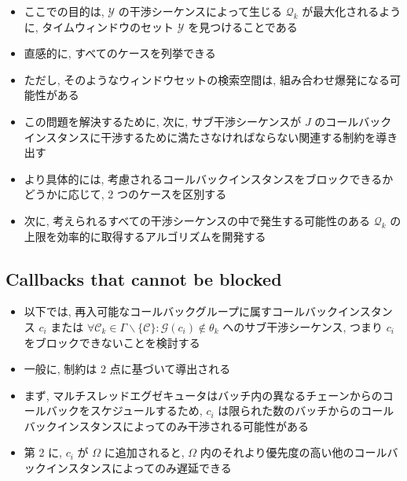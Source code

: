 \begin{frame}{}
    \begin{itemize}
        \item ここでの目的は, $\mathcal{Y}$ の干渉シーケンスによって生じる $\mathcal{Q}_{k}$ が最大化されるように, タイムウィンドウのセット $\mathcal{Y}$ を見つけることである
        \item 直感的に, すべてのケースを列挙できる
        \item ただし, そのようなウィンドウセットの検索空間は, 組み合わせ爆発になる可能性がある
        \item この問題を解決するために, 次に, サブ干渉シーケンスが $J$ のコールバックインスタンスに干渉するために満たさなければならない関連する制約を導き出す
        \item より具体的には, 考慮されるコールバックインスタンスをブロックできるかどうかに応じて, 2 つのケースを区別する
        \item 次に, 考えられるすべての干渉シーケンスの中で発生する可能性のある $\mathcal{Q}_{k}$ の上限を効率的に取得するアルゴリズムを開発する
    \end{itemize}
\end{frame}


\subsection{Callbacks that cannot be blocked}
\label{ssec: callbacks_that_cannot_be_blocked}

\begin{frame}{}
    \begin{itemize}
        \item 以下では, 再入可能なコールバックグループに属すコールバックインスタンス $c_{i}$ または $\forall \mathcal{C}_{k} \in \Gamma \backslash\{\mathcal{C}\}: \mathcal{G}\left(c_{i}\right) \notin \theta_{k}$ へのサブ干渉シーケンス, つまり $c_{i}$ をブロックできないことを検討する
        \item 一般に, 制約は 2 点に基づいて導出される
        \item まず, マルチスレッドエグゼキュータはバッチ内の異なるチェーンからのコールバックをスケジュールするため, $c_{i}$ は限られた数のバッチからのコールバックインスタンスによってのみ干渉される可能性がある
        \item 第 2 に, $c_{i}$ が $\Omega$ に追加されると, $\Omega$ 内のそれより優先度の高い他のコールバックインスタンスによってのみ遅延できる
    \end{itemize}
\end{frame}

